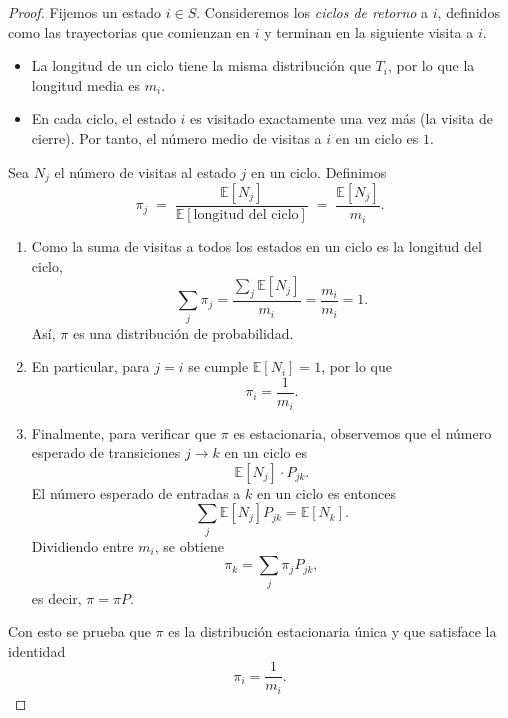 \documentclass[12pt,a4paper]{article}
\begin{document}
\begin{proof}
Fijemos un estado $i \in S$. Consideremos los \emph{ciclos de retorno} a $i$, definidos como las trayectorias que comienzan en $i$ y terminan en la siguiente visita a $i$.  

\begin{itemize}
\item La longitud de un ciclo tiene la misma distribución que $T_i$, por lo que la longitud media es $m_i$.
\item En cada ciclo, el estado $i$ es visitado exactamente una vez más (la visita de cierre). Por tanto, el número medio de visitas a $i$ en un ciclo es $1$.
\end{itemize}

Sea $N_j$ el número de visitas al estado $j$ en un ciclo. Definimos
\[
\pi_j \;=\; \frac{\mathbb{E}[N_j]}{\mathbb{E}[\text{longitud del ciclo}]} \;=\; \frac{\mathbb{E}[N_j]}{m_i}.
\]

\begin{enumerate}
\item Como la suma de visitas a todos los estados en un ciclo es la longitud del ciclo,
\[
\sum_j \pi_j = \frac{\sum_j \mathbb{E}[N_j]}{m_i} = \frac{m_i}{m_i} = 1.
\]
Así, $\pi$ es una distribución de probabilidad.

\item En particular, para $j=i$ se cumple $\mathbb{E}[N_i]=1$, por lo que
\[
\pi_i = \frac{1}{m_i}.
\]

\item Finalmente, para verificar que $\pi$ es estacionaria, observemos que el número esperado de transiciones $j \to k$ en un ciclo es
\[
\mathbb{E}[N_j] \cdot P_{jk}.
\]
El número esperado de entradas a $k$ en un ciclo es entonces
\[
\sum_j \mathbb{E}[N_j] P_{jk} = \mathbb{E}[N_k].
\]
Dividiendo entre $m_i$, se obtiene
\[
\pi_k = \sum_j \pi_j P_{jk},
\]
es decir, $\pi = \pi P$.
\end{enumerate}

Con esto se prueba que $\pi$ es la distribución estacionaria única y que satisface la identidad
\[
\pi_i = \frac{1}{m_i}.
\]
\end{proof}
\end{document}
